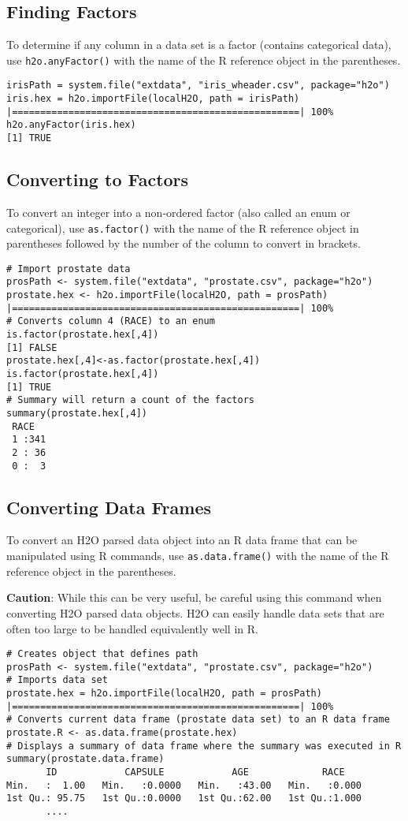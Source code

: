 \subsection{Finding Factors}

To determine if any column in a data set is a factor (contains categorical data), use {\texttt{h2o.anyFactor()}} with the name of the R reference object in the parentheses. 
\begin{lstlisting}[style=R]
irisPath = system.file("extdata", "iris_wheader.csv", package="h2o")
iris.hex = h2o.importFile(localH2O, path = irisPath)
|===================================================| 100%
h2o.anyFactor(iris.hex)
[1] TRUE
\end{lstlisting}

\subsection{Converting to Factors}
To convert an integer into a non-ordered factor (also called an enum or categorical), use {\texttt{as.factor()}} with the name of the R reference object in parentheses followed by the number of the column to convert in brackets. 
\begin{lstlisting}[style=R]
# Import prostate data
prosPath <- system.file("extdata", "prostate.csv", package="h2o")
prostate.hex <- h2o.importFile(localH2O, path = prosPath)
|===================================================| 100%
# Converts column 4 (RACE) to an enum
is.factor(prostate.hex[,4])
[1] FALSE
prostate.hex[,4]<-as.factor(prostate.hex[,4]) 
is.factor(prostate.hex[,4])
[1] TRUE
# Summary will return a count of the factors
summary(prostate.hex[,4])
 RACE   
 1 :341 
 2 : 36 
 0 :  3 
\end{lstlisting}
\subsection{Converting Data Frames}

To convert an H2O parsed data object into an R data frame that can be manipulated using R commands, use {\texttt{as.data.frame()}} with the name of the R reference object in the parentheses.

{\textbf{Caution}}: While this can be very useful, be careful using this command when converting H2O parsed data objects. H2O can easily handle data sets that are often too large to be handled equivalently well in R. 
\begin{lstlisting}[style=R]
# Creates object that defines path
prosPath <- system.file("extdata", "prostate.csv", package="h2o")
# Imports data set
prostate.hex = h2o.importFile(localH2O, path = prosPath)
|===================================================| 100%
# Converts current data frame (prostate data set) to an R data frame
prostate.R <- as.data.frame(prostate.hex)
# Displays a summary of data frame where the summary was executed in R
summary(prostate.data.frame) 
       ID            CAPSULE            AGE             RACE
Min.   :  1.00   Min.   :0.0000   Min.   :43.00   Min.   :0.000
1st Qu.: 95.75   1st Qu.:0.0000   1st Qu.:62.00   1st Qu.:1.000
       .... 
\end{lstlisting}


